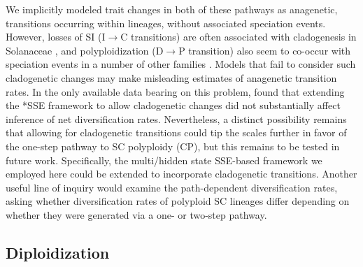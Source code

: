 We implicitly modeled trait changes in both of these pathways as anagenetic, transitions occurring within lineages, without associated speciation events.
However, losses of SI (I$\rightarrow$C transitions) are often associated with cladogenesis in Solanaceae \citep{goldberg_2012}, and polyploidization (D$\rightarrow$P transition) also seem to co-occur with speciation events in a number of other families \citep{zhan_2016,freyman_2017}.
Models that fail to consider such cladogenetic changes may make misleading estimates of anagenetic transition rates.
In the only available data bearing on this problem, \citet{goldberg_2012} found that extending the *SSE framework to allow cladogenetic changes did not substantially affect inference of net diversification rates.
Nevertheless, a distinct possibility remains that allowing for cladogenetic transitions could tip the scales further in favor of the one-step pathway to SC polyploidy (CP), but this remains to be tested in future work. %
Specifically, the multi/hidden state SSE-based framework we employed here could be extended to incorporate cladogenetic transitions. %
Another useful line of inquiry would examine the path-dependent diversification rates, asking whether diversification rates of polyploid SC lineages differ depending on whether they were generated via a one- or two-step pathway. %

%

\subsection*{Diploidization}

